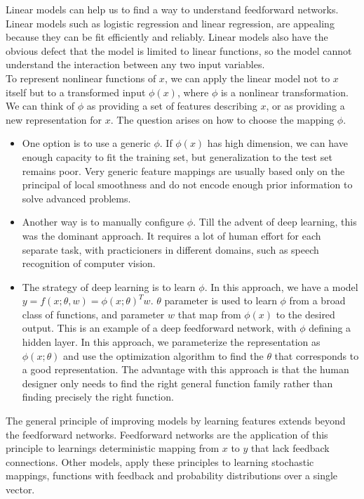 Linear models can help us to find a way to understand feedforward networks. Linear models such as logistic regression and linear regression, are appealing  because they can be fit efficiently and reliably. Linear models also have the obvious defect that the model is limited to linear functions, so the model cannot understand the interaction between any two input variables. \\
To represent nonlinear functions of $x$, we can apply the linear model not to $x$ itself but to a transformed input $\phi(x)$, where $\phi$ is a nonlinear transformation. We can think of $\phi$ as providing a set of features describing $x$, or as providing a new representation for $x$. 
The question arises on how to choose the mapping $\phi$.
\begin{itemize}
\item One option is to use a generic $\phi$. If $\phi(x)$ has high dimension, we can have enough capacity to fit the training set, but generalization to the test set remains poor. Very generic feature mappings are usually based only on the principal of local smoothness and do not encode enough prior information to solve advanced problems. \cite{Goodfellow-et-al-2016}
\item Another way is to manually configure $\phi$. Till the advent of deep learning, this was the dominant approach. It requires a lot of human effort for each separate task, with practicioners in different domains, such as speech recognition of computer vision.\cite{Goodfellow-et-al-2016}
\item The strategy of deep learning is to learn $\phi$. In this approach, we have a model $y = f(x;\theta,w)= \phi(x;\theta)^T w $. $\theta$ parameter is used to learn $\phi$ from a broad class of functions, and parameter $w$ that map from $\phi(x)$ to the desired output. This is an example of a deep feedforward network, with $\phi$ defining a hidden layer. In this approach, we parameterize the representation as $\phi(x;\theta)$ and use the optimization algorithm to find the $\theta$ that corresponds to a good representation. The advantage with this approach is that the human designer only needs to find the right general function family rather than finding precisely the right function.  \cite{Goodfellow-et-al-2016}\\
\end{itemize}
The general principle of improving models by learning features extends beyond the feedforward networks. Feedforward networks are the application of this principle to learnings deterministic mapping from $x$ to $y$ that lack feedback connections. Other models, apply these principles to learning stochastic mappings, functions with feedback and probability distributions over a single vector. \cite{Goodfellow-et-al-2016}\\
